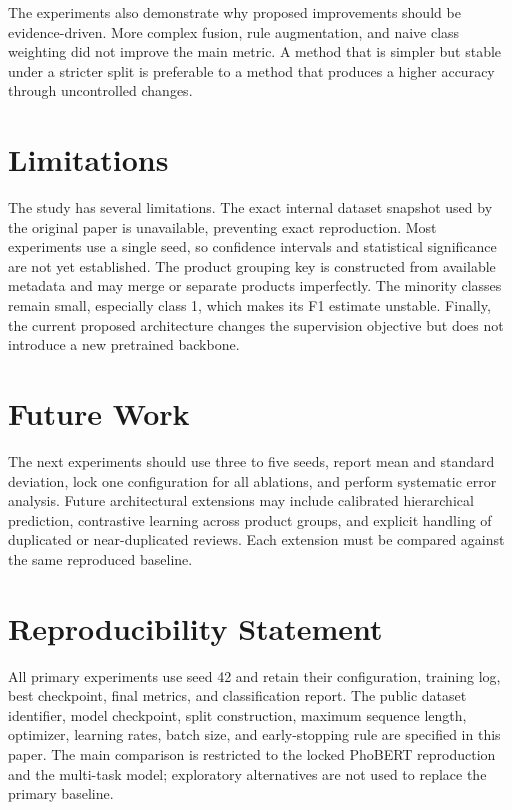 \documentclass[runningheads]{llncs}
\begin{document}
The experiments also demonstrate why proposed improvements should be evidence-driven. More complex fusion, rule augmentation, and naive class weighting did not improve the main metric. A method that is simpler but stable under a stricter split is preferable to a method that produces a higher accuracy through uncontrolled changes.

\section{Limitations}
The study has several limitations. The exact internal dataset snapshot used by the original paper is unavailable, preventing exact reproduction. Most experiments use a single seed, so confidence intervals and statistical significance are not yet established. The product grouping key is constructed from available metadata and may merge or separate products imperfectly. The minority classes remain small, especially class 1, which makes its F1 estimate unstable. Finally, the current proposed architecture changes the supervision objective but does not introduce a new pretrained backbone.

\section{Future Work}
The next experiments should use three to five seeds, report mean and standard deviation, lock one configuration for all ablations, and perform systematic error analysis. Future architectural extensions may include calibrated hierarchical prediction, contrastive learning across product groups, and explicit handling of duplicated or near-duplicated reviews. Each extension must be compared against the same reproduced baseline.

\section{Reproducibility Statement}
All primary experiments use seed 42 and retain their configuration, training log, best checkpoint, final metrics, and classification report. The public dataset identifier, model checkpoint, split construction, maximum sequence length, optimizer, learning rates, batch size, and early-stopping rule are specified in this paper. The main comparison is restricted to the locked PhoBERT reproduction and the multi-task model; exploratory alternatives are not used to replace the primary baseline.
\end{document}
